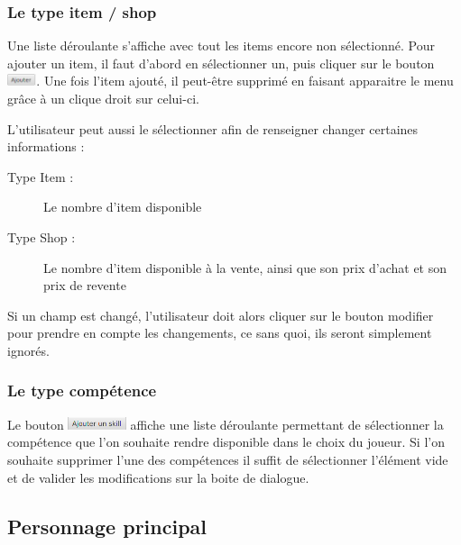 			\subsubsection{Le type item / shop}
				\label{subsubsec:item_shop}

				Une liste déroulante s'affiche avec tout les items encore non sélectionné. Pour ajouter un item, il faut d'abord en sélectionner un, puis cliquer sur le bouton \includegraphics[height=10pt, keepaspectratio]{img/ajouterBouton.png}. Une fois l'item ajouté, il peut-être supprimé en faisant apparaitre le menu grâce à un clique droit sur celui-ci.

				L'utilisateur peut aussi le sélectionner afin de renseigner changer certaines informations :

				\begin{description}
					\item[Type Item :] Le nombre d'item disponible
					\item[Type Shop :] Le nombre d'item disponible à la vente, ainsi que son prix d'achat et son prix de revente
				\end{description}

				Si un champ est changé, l'utilisateur doit alors cliquer sur le bouton modifier pour prendre en compte les changements, ce sans quoi, ils seront simplement ignorés.

			\subsubsection{Le type compétence}
				 \label{subsubsec:persoCreationSkill}

				Le bouton \includegraphics[height=10pt, keepaspectratio]{img/preludeAjouterSkillBouton.png} affiche une liste déroulante permettant de sélectionner la compétence que l'on souhaite rendre disponible dans le choix du joueur. Si l'on souhaite supprimer l'une des compétences il suffit de sélectionner l'élément vide et de valider les modifications sur la boite de dialogue.

		\subsection{Personnage principal}
			\label{subsec:main_character}

